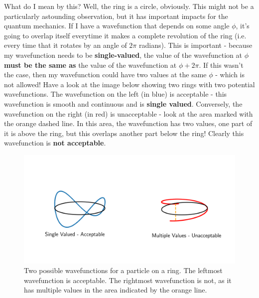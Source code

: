 \documentclass{memoir}[11pt,oneside,a4paper,openany]
\begin{document}
What do I mean by this? Well, the ring is a circle, obviously. This might not be a particularly astounding observation, but it has important impacts for the quantum mechanics. If I have a wavefunction that depends on some angle $\phi$, it's going to overlap itself everytime it makes a complete revolution of the ring (i.e. every time that it rotates by an angle of $2\pi$ radians). This is important - because my wavefunction needs to be \textbf{single-valued}, the value of the wavefunction at $\phi$ \textbf{must be the same as} the value of the wavefunction at $\phi+2\pi$. If this wasn't the case, then my wavefunction could have two values at the same $\phi$ - which is not allowed! Have a look at the image below showing two rings with two potential wavefunctions. The wavefunction on the left (in blue) is acceptable - this wavefunction is smooth and continuous and is \textbf{single valued}. Conversely, the wavefunction on the right (in red) is unacceptable - look at the area marked with the orange dashed line. In this area, the wavefunction has two values, one part of it is above the ring, but this overlaps another part below the ring! Clearly this wavefunction is \textbf{not acceptable}. 
\begin{figure}[h]
	\centering
	\includegraphics[width=\textwidth]{rotational_wavefunctions}
	\caption{Two possible wavefunctions for a particle on a ring. The leftmost wavefunction is acceptable. The rightmost wavefunction is not, as it has multiple values in the area indicated by the orange line.}
\end{figure}
\end{document}
